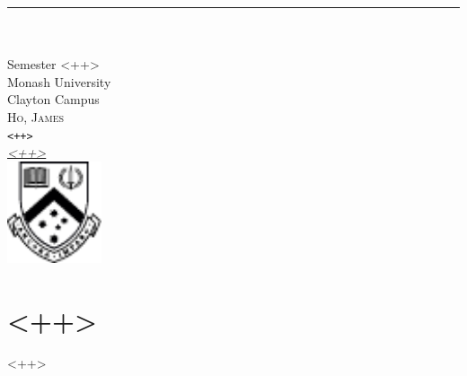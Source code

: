 \documentclass[12pt]{article}
\newcommand{\metatitle}{<++>} %
\newcommand{\metasubtitle}{<++>} %
\newcommand{\metaauthor}{Ho, James}
\newcommand{\metaemail}{<++>}
\begin{document}
\begin{titlepage}
  \raggedleft

  \rule{1pt}{\textheight}
  \hspace{0.05\textwidth}
  \parbox[b]{0.75\textwidth}{
    \vspace{\fill}
    {\Huge\bfseries \metatitle{}}\\[1cm]
    {\Large \metasubtitle{}}\\[0.1cm]
    {\large Semester <++>} \\[1.5cm] %
    {\large Monash University \\[0.1cm]Clayton Campus}\\[3cm]
    { \Large\textsc{\metaauthor} \\[0.1cm]
      \texttt{<++>} \\[0.1cm] %
      \href{mailto:\metaemail{}}{\textit{\metaemail{}}}
    } \\[0.5cm]
    \includegraphics[height=3cm]{monash2.pdf}
    \hspace*{\fill}
    \setlength{\fboxsep}{0pt}
  }
\end{titlepage}

\section{<++>}
<++>

\newpage
\printbibliography
\end{document}
